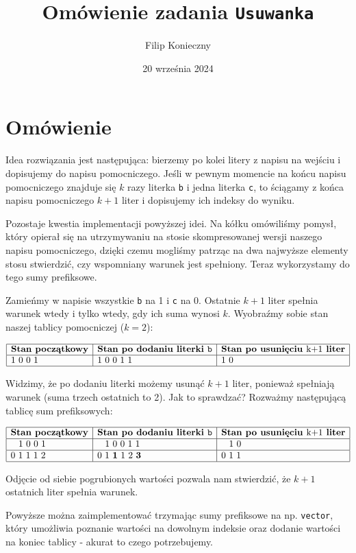 \documentclass[]{article}
\author{Filip Konieczny}
\date{20 września 2024}
\title{Omówienie zadania \texttt{Usuwanka}}
\begin{document}
\maketitle
\section{Omówienie}

Idea rozwiązania jest następująca: bierzemy po kolei litery z napisu na wejściu i dopisujemy do napisu pomocniczego. Jeśli w pewnym momencie na końcu napisu pomocniczego znajduje się $k$ razy literka \texttt{b} i jedna literka \texttt{c}, to ściągamy z końca napisu pomocniczego $k+1$ liter i dopisujemy ich indeksy do wyniku.

Pozostaje kwestia implementacji powyższej idei. Na kółku omówiliśmy pomysł, który opierał się na utrzymywaniu na stosie skompresowanej wersji naszego napisu pomocniczego, dzięki czemu mogliśmy patrząc na dwa najwyższe elementy stosu stwierdzić, czy wspomniany warunek jest spełniony. Teraz wykorzystamy do tego sumy prefiksowe.

Zamieńmy w napisie wszystkie \texttt{b} na 1 i \texttt{c} na 0. Ostatnie $k+1$ liter spełnia warunek wtedy i tylko wtedy, gdy ich suma wynosi $k$. Wyobraźmy sobie stan naszej tablicy pomocniczej ($k = 2$):

\[\begin{array}{|l|l|l|}
    \hline

    \textbf{Stan początkowy} & \textbf{Stan po dodaniu literki } \texttt{b} & \textbf{Stan po usunięciu } $k+1$ \textbf{ liter} \\
    \hline
    1~0~0~1 &   1~0~0~1~1 & 1~0 \\
    \hline
    
\end{array}\]

Widzimy, że po dodaniu literki możemy usunąć $k+1$ liter, ponieważ spełniają warunek (suma trzech ostatnich to 2). Jak to sprawdzać? Rozważmy następującą tablicę sum prefiksowych:

\[\begin{array}{|l|l|l|}
\hline
    \textbf{Stan początkowy} & \textbf{Stan po dodaniu literki } \texttt{b} & \textbf{Stan po usunięciu } $k+1$ \textbf{ liter} \\
\hline
 \hspace{0.3cm} 1~0~0~1 &   \hspace{0.3cm} 1~0~0~1~1 & \hspace{0.3cm} 1~0 \\
 \hline 
 0~1~1~1~2 &   0~1~\textbf{1}~1~2~\textbf{3} & 0~1~1 \\
 \hline
    
\end{array}\]

Odjęcie od siebie pogrubionych wartości pozwala nam stwierdzić, że $k+1$ ostatnich liter spełnia warunek.

Powyższe można zaimplementować trzymając sumy prefiksowe na np. \texttt{vector}, który umożliwia poznanie wartości na dowolnym indeksie oraz dodanie wartości na koniec tablicy - akurat to czego potrzebujemy.
\end{document}
